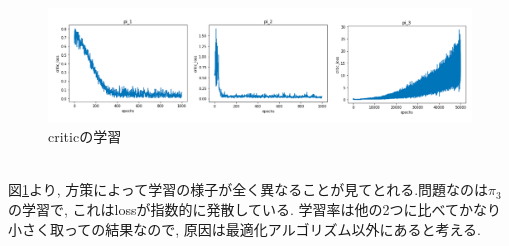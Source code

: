 \documentclass{jsarticle}
\begin{document}
{\begin{figure}[h]
	\centering
 	\includegraphics[width=15cm]{critic_loss.png}
 	\caption{criticの学習} \label{critic_loss}
\end{figure}\\
図\ref{critic_loss}より, 方策によって学習の様子が全く異なることが見てとれる.問題なのは$\pi_3$の学習で, これはlossが指数的に発散している. 学習率は他の2つに比べてかなり小さく取っての結果なので, 原因は最適化アルゴリズム以外にあると考える.

}
\end{document}
